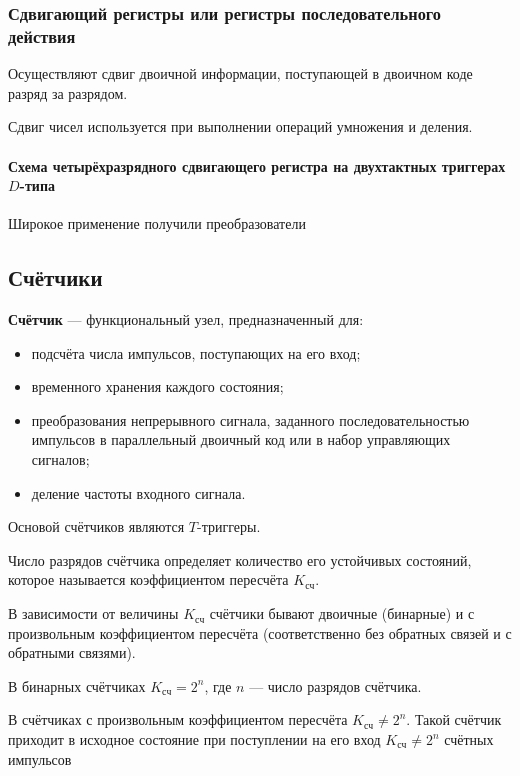 \documentclass[10pt,a4paper,titlepage]{article}
\begin{document}
\subsubsection{Сдвигающий регистры или регистры последовательного действия}

Осуществляют сдвиг двоичной информации, поступающей в двоичном коде разряд за разрядом.

Сдвиг чисел используется при выполнении операций умножения и деления.
\paragraph{Схема четырёхразрядного сдвигающего регистра на двухтактных триггерах $D$-типа}


Широкое применение получили преобразователи

\subsection{Счётчики}

\textbf{Счётчик} --- функциональный узел, предназначенный для:
\begin{itemize}
\item подсчёта числа импульсов, поступающих на его вход;
\item временного хранения каждого состояния;
\item преобразования непрерывного сигнала, заданного последовательностью импульсов в параллельный двоичный код или в набор управляющих сигналов;
\item деление частоты входного сигнала.
\end{itemize}

Основой счётчиков являются $T$-триггеры.

Число разрядов счётчика определяет количество его устойчивых состояний, которое называется коэффициентом пересчёта $K_{сч}$.

В зависимости от величины $K_{сч}$ счётчики бывают двоичные (бинарные) и с произвольным коэффициентом пересчёта (соответственно без обратных связей и с обратными связями).

В бинарных счётчиках $K_{сч} = 2^n$, где $n$ --- число разрядов счётчика.

В счётчиках с произвольным коэффициентом пересчёта $K_{сч}\not=2^n$.
Такой счётчик приходит в исходное состояние при поступлении на его вход $K_{сч} \not = 2^n$ счётных импульсов
\end{document}
